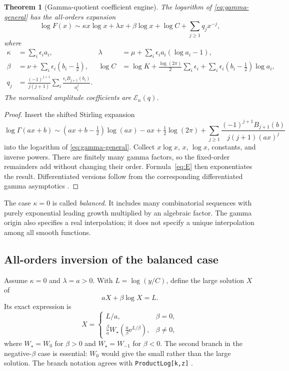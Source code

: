 \documentclass[11pt,a4paper]{article}
\numberwithin{equation}{section}
\newtheorem{theorem}{Theorem}[section]
\theoremstyle{definition}
\theoremstyle{remark}
\newcommand{\ee}{\mathrm e}
\newcommand{\cE}{\mathcal E}
\begin{document}
\begin{theorem}[Gamma-quotient coefficient engine]
\label{thm:gamma}
The logarithm of \eqref{eq:gamma-general} has the all-orders expansion
\begin{equation}
 \log F(x)\sim\kappa x\log x+\lambda x+\beta\log x+\log C
                      +\sum_{j\ge1}q_jx^{-j},
 \label{eq:gamma-log}
\end{equation}
where
\begin{align}
 \kappa&=\sum_i\epsilon_i a_i,
 &\lambda&=\mu+\sum_i\epsilon_i a_i(\log a_i-1),\nonumber\\
 \beta&=\nu+\sum_i\epsilon_i(b_i-\tfrac12),
 &\log C&=\log K+\frac{\log(2\pi)}2\sum_i\epsilon_i
           +\sum_i\epsilon_i(b_i-\tfrac12)\log a_i,
 \label{eq:gamma-constants}\\
 q_j&=\frac{(-1)^{j+1}}{j(j+1)}
       \sum_i\frac{\epsilon_iB_{j+1}(b_i)}{a_i^j}.
 \label{eq:gamma-q}
\end{align}
The normalized amplitude coefficients are $\cE_n(q)$.
\end{theorem}
\begin{proof}
Insert the shifted Stirling expansion
\[
 \log\Gamma(ax+b)
 \sim (ax+b-\tfrac12)\log(ax)-ax+\tfrac12\log(2\pi)
 +\sum_{j\ge1}\frac{(-1)^{j+1}B_{j+1}(b)}{j(j+1)(ax)^j}
\]
into the logarithm of \eqref{eq:gamma-general}. Collect $x\log x$, $x$, $\log x$, constants, and inverse powers. There are finitely many gamma factors, so the fixed-order remainders add without changing their order. Formula~\eqref{eq:E} then exponentiates the result. Differentiated versions follow from the corresponding differentiated gamma asymptotics \cite{dlmfgamma}.
\end{proof}

The case $\kappa=0$ is called \emph{balanced}. It includes many combinatorial sequences with purely exponential leading growth multiplied by an algebraic factor. The gamma origin also specifies a real interpolation; it does not specify a unique interpolation among all smooth functions.

\subsection{All-orders inversion of the balanced case}

Assume $\kappa=0$ and $\lambda=a>0$. With $L=\log(y/C)$, define the large solution $X$ of
\begin{equation}
 aX+\beta\log X=L.
 \label{eq:balanced-core}
\end{equation}
Its exact expression is
\begin{equation}
 X=\begin{cases}
 L/a,&\beta=0,\\[1mm]
 \displaystyle\frac{\beta}{a}
 W_{\star}\!\left(\frac a\beta\ee^{L/\beta}\right),&\beta\ne0,
 \end{cases}
 \label{eq:balanced-W}
\end{equation}
where $W_\star=W_0$ for $\beta>0$ and $W_\star=W_{-1}$ for $\beta<0$. The second branch in the negative-$\beta$ case is essential: $W_0$ would give the small rather than the large solution. The branch notation agrees with \texttt{ProductLog[k,z]} \cite{wlproductlog}.
\end{document}
